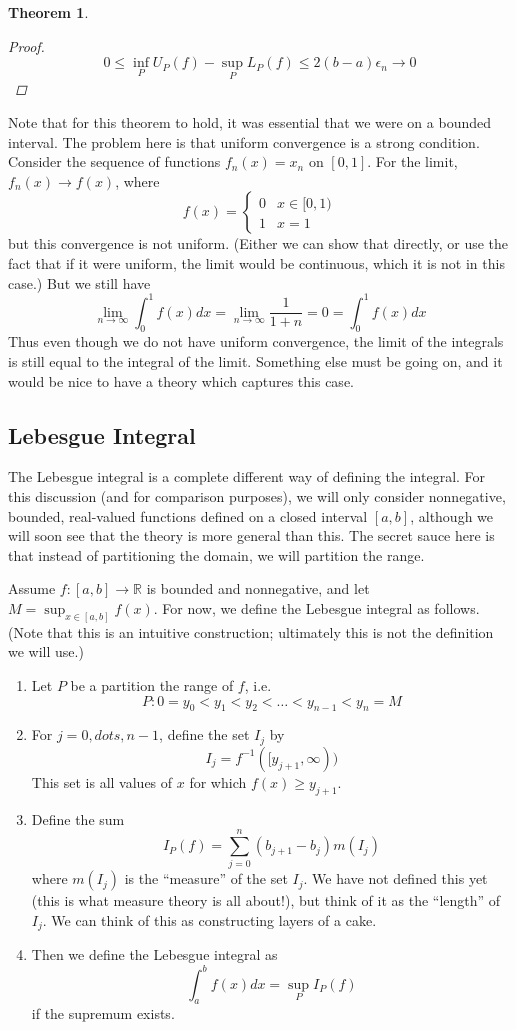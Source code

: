 \documentclass[12pt]{amsart}         %
\newtheorem{theorem}{Theorem}[section]
\theoremstyle{remark}
\newcommand{\R}{\mathbb{R}}
\begin{document}
\begin{itemize}
\begin{theorem}
\begin{proof}
    \[
    0 \leq \inf_P U_P(f) - \sup_P L_P(f) \leq 2(b-a)\epsilon_n \rightarrow 0
    \]
    \end{proof}
    \end{theorem}
    Note that for this theorem to hold, it was essential that we were on a bounded interval. The problem here is that uniform convergence is a strong condition. Consider the sequence of functions $f_n(x) = x_n$ on $[0, 1]$. For the limit, $f_n(x) \rightarrow f(x)$, where
    \[
    f(x) = \begin{cases}
    0 & x \in [0, 1) \\
    1 & x = 1
    \end{cases}
    \]
    but this convergence is not uniform. (Either we can show that directly, or use the fact that if it were uniform, the limit would be continuous, which it is not in this case.) But we still have
    \[
    \lim_{n \rightarrow \infty} \int_0^1 f(x) dx = \lim_{n \rightarrow \infty} \frac{1}{1+n} = 0 = \int_0^1 f(x) dx
    \]
    Thus even though we do not have uniform convergence, the limit of the integrals is still equal to the integral of the limit. Something else must be going on, and it would be nice to have a theory which captures this case.
\end{itemize}

\subsection{Lebesgue Integral}

The Lebesgue integral is a complete different way of defining the integral. For this discussion (and for comparison purposes), we will only consider nonnegative, bounded, real-valued functions defined on a closed interval $[a, b]$, although we will soon see that the theory is more general than this. The secret sauce here is that instead of partitioning the domain, we will partition the range.

Assume $f:[a,b] \rightarrow \R$ is bounded and nonnegative, and let $M = \sup_{x \in [a,b]} f(x)$. For now, we define the Lebesgue integral as follows. (Note that this is an intuitive construction; ultimately this is not the definition we will use.)
\begin{enumerate}
\item Let $P$ be a partition the range of $f$, i.e.
\[
P : 0 = y_0 < y_1 < y_2 < \dots < y_{n-1} < y_n = M
\]
\item For $j = 0, dots, n-1$, define the set $I_j$ by
\[
I_j = f^{-1}([y_{j+1}, \infty))
\]
This set is all values of $x$ for which $f(x) \geq y_{j+1}$.
\item Define the sum
\[
I_P(f) = \sum_{j=0}^{n}(b_{j+1}-b_{j})m(I_j)
\]
where $m(I_j)$ is the ``measure'' of the set $I_j$. We have not defined this yet (this is what measure theory is all about!), but think of it as the ``length'' of $I_j$.  We can think of this as constructing layers of a cake. 
\item Then we define the Lebesgue integral as
\[
\int_{a}^{b}f(x)dx = \sup_P I_P(f)
\]
if the supremum exists.
\end{enumerate}
\end{document}

